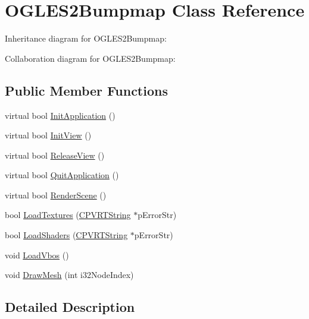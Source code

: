 \hypertarget{class_o_g_l_e_s2_bumpmap}{\section{O\+G\+L\+E\+S2\+Bumpmap Class Reference}
\label{class_o_g_l_e_s2_bumpmap}
}


Inheritance diagram for O\+G\+L\+E\+S2\+Bumpmap\+:


Collaboration diagram for O\+G\+L\+E\+S2\+Bumpmap\+:
\subsection*{Public Member Functions}
\begin{DoxyCompactItemize}
\item 
virtual bool \hyperlink{class_o_g_l_e_s2_bumpmap_a236584fb95b3f318dd1930df733384d7}{Init\+Application} ()
\item 
virtual bool \hyperlink{class_o_g_l_e_s2_bumpmap_ac191bbfc6523e6b49406df36cc96e6c1}{Init\+View} ()
\item 
virtual bool \hyperlink{class_o_g_l_e_s2_bumpmap_a37617a5d171031f983dfee799090a348}{Release\+View} ()
\item 
virtual bool \hyperlink{class_o_g_l_e_s2_bumpmap_a7f0876d9df689141c9c27899c5d199cf}{Quit\+Application} ()
\item 
virtual bool \hyperlink{class_o_g_l_e_s2_bumpmap_a1551ce2b8cd64897fb6a9eb140506033}{Render\+Scene} ()
\item 
bool \hyperlink{class_o_g_l_e_s2_bumpmap_a626d0438f93255e70c680d1530b6b7ec}{Load\+Textures} (\hyperlink{class_c_p_v_r_t_string}{C\+P\+V\+R\+T\+String} $\ast$p\+Error\+Str)
\item 
bool \hyperlink{class_o_g_l_e_s2_bumpmap_ae9ec3cdfa1545ea2f6696ab833f159f6}{Load\+Shaders} (\hyperlink{class_c_p_v_r_t_string}{C\+P\+V\+R\+T\+String} $\ast$p\+Error\+Str)
\item 
void \hyperlink{class_o_g_l_e_s2_bumpmap_a4ca7444d9c4d7cab0cc1b4ed79b6758f}{Load\+Vbos} ()
\item 
void \hyperlink{class_o_g_l_e_s2_bumpmap_a57e000f44662f0794303f5e8d50de059}{Draw\+Mesh} (int i32\+Node\+Index)
\end{DoxyCompactItemize}


\subsection{Detailed Description}



